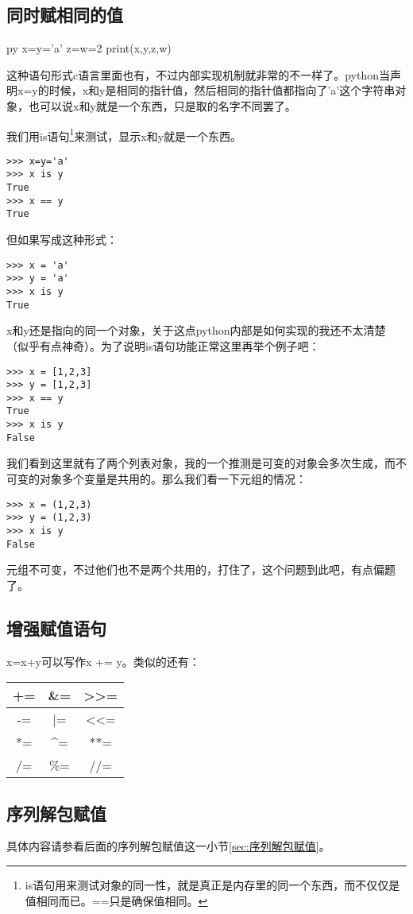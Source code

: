 \documentclass[12pt,oneside]{book}
\begin{document}
\begin{common-format}
\subsection{同时赋相同的值}
\begin{xverbatim}[129]{py}
x=y='a'
z=w=2
print(x,y,z,w)
\end{xverbatim}

这种语句形式c语言里面也有，不过内部实现机制就非常的不一样了。python当声明x=y的时候，x和y是相同的指针值，然后相同的指针值都指向了'a'这个字符串对象，也可以说x和y就是一个东西，只是取的名字不同罢了。

我们用is语句\footnote{is语句用来测试对象的同一性，就是真正是内存里的同一个东西，而不仅仅是值相同而已。==只是确保值相同。}来测试，显示x和y就是一个东西。
\begin{Verbatim}
>>> x=y='a'
>>> x is y
True
>>> x == y
True
\end{Verbatim}


但如果写成这种形式：
\begin{Verbatim}
>>> x = 'a'
>>> y = 'a'
>>> x is y
True
\end{Verbatim}
x和y还是指向的同一个对象，关于这点python内部是如何实现的我还不太清楚（似乎有点神奇）。为了说明is语句功能正常这里再举个例子吧：
\begin{Verbatim}
>>> x = [1,2,3]
>>> y = [1,2,3]
>>> x == y
True
>>> x is y
False
\end{Verbatim}
我们看到这里就有了两个列表对象，我的一个推测是可变的对象会多次生成，而不可变的对象多个变量是共用的。那么我们看一下元组的情况：
\begin{Verbatim}
>>> x = (1,2,3)
>>> y = (1,2,3)
>>> x is y
False
\end{Verbatim}
元组不可变，不过他们也不是两个共用的，打住了，这个问题到此吧，有点偏题了。



\subsection{增强赋值语句}
x=x+y可以写作x += y。类似的还有：
\begin{tabular}{|c|c|c|}
\hline 
+= & \&{}= & >>= \\ 
\hline 
-= & |= & <<= \\ 
\hline 
*= & \^{}= & **= \\ 
\hline 
/= & \%{}= & //= \\ 
\hline 
\end{tabular} 

\subsection{序列解包赋值}
具体内容请参看后面的序列解包赋值这一小节\ref{sec:序列解包赋值}。


\end{common-format}
\end{document}
